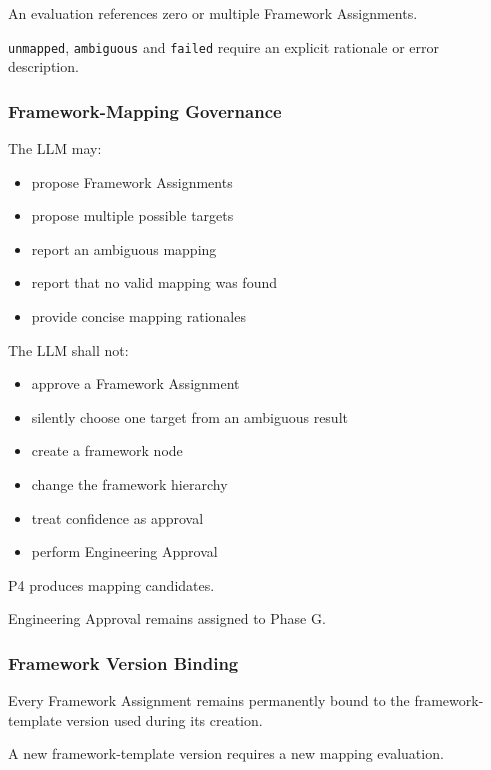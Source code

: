 An evaluation references zero or multiple Framework Assignments.

\texttt{unmapped}, \texttt{ambiguous} and \texttt{failed} require an explicit rationale or error description.

\hypertarget{framework-mapping-governance}{%
\subsubsection{Framework-Mapping Governance}\label{framework-mapping-governance}}

The LLM may:

\begin{itemize}
\tightlist
\item
  propose Framework Assignments
\item
  propose multiple possible targets
\item
  report an ambiguous mapping
\item
  report that no valid mapping was found
\item
  provide concise mapping rationales
\end{itemize}

The LLM shall not:

\begin{itemize}
\tightlist
\item
  approve a Framework Assignment
\item
  silently choose one target from an ambiguous result
\item
  create a framework node
\item
  change the framework hierarchy
\item
  treat confidence as approval
\item
  perform Engineering Approval
\end{itemize}

P4 produces mapping candidates.

Engineering Approval remains assigned to Phase G.

\hypertarget{framework-version-binding}{%
\subsubsection{Framework Version Binding}\label{framework-version-binding}}

Every Framework Assignment remains permanently bound to the framework-template version used during its creation.

A new framework-template version requires a new mapping evaluation.

